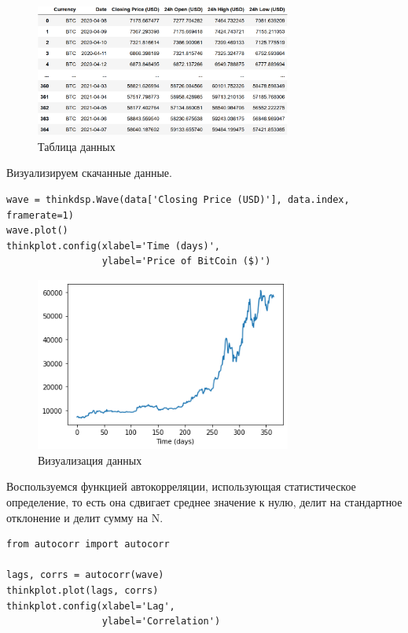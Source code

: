\documentclass[a4paper,12pt]{report}
\begin{document}
\begin{figure}[H]
        \centering
        \includegraphics[width=0.75\textwidth]{lab5_fig3_1.png}
        \caption{Таблица данных}
        \label{fig:lab5_fig3_1}
\end{figure}

Визуализируем скачанные данные.

\begin{lstlisting}[caption=Визуализация данных]
wave = thinkdsp.Wave(data['Closing Price (USD)'], data.index, framerate=1)
wave.plot()
thinkplot.config(xlabel='Time (days)',
                 ylabel='Price of BitCoin ($)')
\end{lstlisting}

\begin{figure}[H]
        \centering
        \includegraphics[width=0.75\textwidth]{lab5_fig3_2.png}
        \caption{Визуализация данных}
        \label{fig:lab5_fig3_2}
\end{figure}

Воспользуемся функцией автокорреляции, использующая статистическое определение, то есть она сдвигает среднее значение к нулю, делит на стандартное отклонение и делит сумму на N.

\begin{lstlisting}[caption=Автокорреляция при помощи \texttt{autocorr}]
from autocorr import autocorr

lags, corrs = autocorr(wave)
thinkplot.plot(lags, corrs)
thinkplot.config(xlabel='Lag',
                 ylabel='Correlation')
\end{lstlisting}
\end{document}
